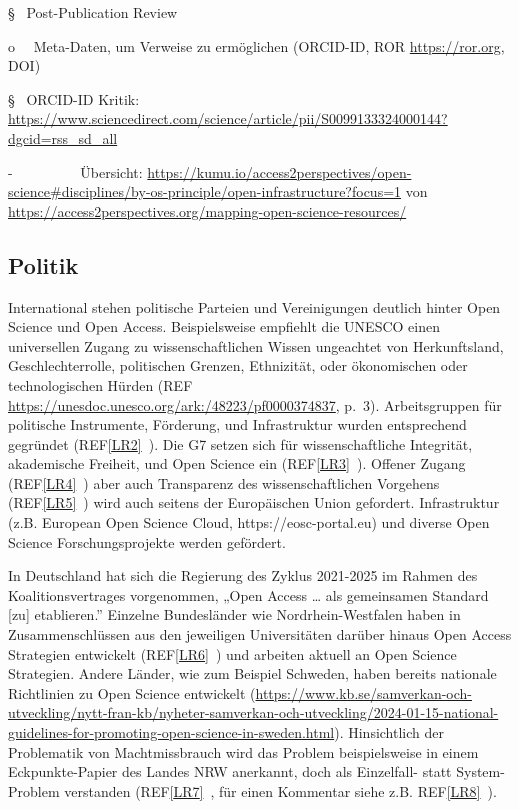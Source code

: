 \documentclass[
  letterpaper,
  DIV=11,
  numbers=noendperiod]{scrreprt}
\begin{document}
§~ Post-Publication Review

o~~ Meta-Daten, um Verweise zu ermöglichen (ORCID-ID, ROR
\url{https://ror.org}, DOI)

§~ ORCID-ID Kritik:
\url{https://www.sciencedirect.com/science/article/pii/S0099133324000144?dgcid=rss_sd_all}

-~~~~~~~~~ Übersicht:
\url{https://kumu.io/access2perspectives/open-science\#disciplines/by-os-principle/open-infrastructure?focus=1}
von
\url{https://access2perspectives.org/mapping-open-science-resources/}

\subsection{Politik}\label{politik}

International stehen politische Parteien und Vereinigungen deutlich
hinter Open Science und Open Access. Beispielsweise empfiehlt die UNESCO
einen universellen Zugang zu wissenschaftlichen Wissen ungeachtet von
Herkunftsland, Geschlechterrolle, politischen Grenzen, Ethnizität, oder
ökonomischen oder technologischen Hürden (REF
\url{https://unesdoc.unesco.org/ark:/48223/pf0000374837}, p.~3).
Arbeitsgruppen für politische Instrumente, Förderung, und Infrastruktur
wurden entsprechend gegründet (REF\hyperref[_msocom_2]{{[}LR2{]}}~). Die
G7 setzen sich für wissenschaftliche Integrität, akademische Freiheit,
und Open Science ein (REF\hyperref[_msocom_3]{{[}LR3{]}}~). Offener
Zugang (REF\hyperref[_msocom_4]{{[}LR4{]}}~) aber auch Transparenz des
wissenschaftlichen Vorgehens (REF\hyperref[_msocom_5]{{[}LR5{]}}~) wird
auch seitens der Europäischen Union gefordert. Infrastruktur (z.B.
European Open Science Cloud, https://eosc-portal.eu) und diverse Open
Science Forschungsprojekte werden gefördert.

In Deutschland hat sich die Regierung des Zyklus 2021-2025 im Rahmen des
Koalitionsvertrages vorgenommen, „Open Access \ldots{} als gemeinsamen
Standard {[}zu{]} etablieren.'' Einzelne Bundesländer wie
Nordrhein-Westfalen haben in Zusammenschlüssen aus den jeweiligen
Universitäten darüber hinaus Open Access Strategien entwickelt
(REF\hyperref[_msocom_6]{{[}LR6{]}}~) und arbeiten aktuell an Open
Science Strategien. Andere Länder, wie zum Beispiel Schweden, haben
bereits nationale Richtlinien zu Open Science entwickelt
(\url{https://www.kb.se/samverkan-och-utveckling/nytt-fran-kb/nyheter-samverkan-och-utveckling/2024-01-15-national-guidelines-for-promoting-open-science-in-sweden.html}).
Hinsichtlich der Problematik von Machtmissbrauch wird das Problem
beispielsweise in einem Eckpunkte-Papier des Landes NRW anerkannt, doch
als Einzelfall- statt System-Problem verstanden
(REF\hyperref[_msocom_7]{{[}LR7{]}}~, für einen Kommentar siehe z.B.
REF\hyperref[_msocom_8]{{[}LR8{]}}~).
\end{document}
